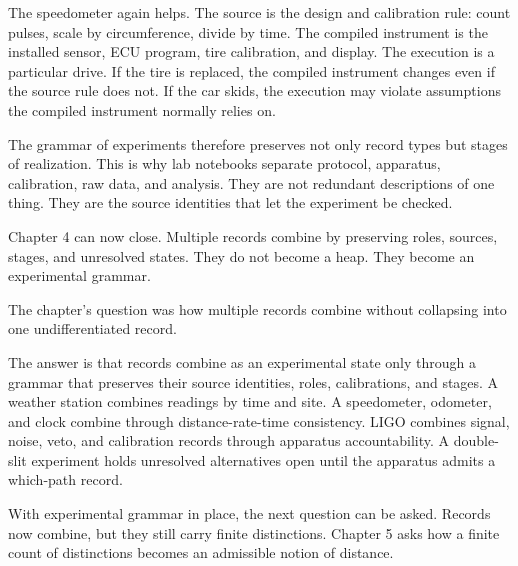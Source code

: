 The speedometer again helps. The source is the design and calibration rule:
count pulses, scale by circumference, divide by time. The compiled instrument
is the installed sensor, ECU program, tire calibration, and display. The
execution is a particular drive. If the tire is replaced, the compiled
instrument changes even if the source rule does not. If the car skids, the
execution may violate assumptions the compiled instrument normally relies on.

The grammar of experiments therefore preserves not only record types but stages
of realization. This is why lab notebooks separate protocol, apparatus,
calibration, raw data, and analysis. They are not redundant descriptions of one
thing. They are the source identities that let the experiment be checked.

Chapter 4 can now close. Multiple records combine by preserving roles, sources,
stages, and unresolved states. They do not become a heap. They become an
experimental grammar.

\begin{bridge}

The chapter's question was how multiple records combine without collapsing into
one undifferentiated record.

The answer is that records combine as an experimental state only through a
grammar that preserves their source identities, roles, calibrations, and stages.
A weather station combines readings by time and site. A speedometer, odometer,
and clock combine through distance-rate-time consistency. LIGO combines signal,
noise, veto, and calibration records through apparatus accountability. A
double-slit experiment holds unresolved alternatives open until the apparatus
admits a which-path record.

With experimental grammar in place, the next question can be asked. Records now
combine, but they still carry finite distinctions. Chapter 5 asks how a finite
count of distinctions becomes an admissible notion of distance.

\end{bridge}

